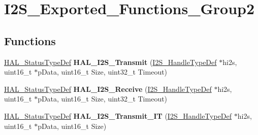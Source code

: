 \hypertarget{group___i2_s___exported___functions___group2}{}\section{I2\+S\+\_\+\+Exported\+\_\+\+Functions\+\_\+\+Group2}
\label{group___i2_s___exported___functions___group2}
\subsection*{Functions}
\begin{DoxyCompactItemize}
\item 
\mbox{\label{group___i2_s___exported___functions___group2_gad53c7444525547c934ee322ca1197dfb}} 
\hyperlink{stm32f4xx__hal__def_8h_a63c0679d1cb8b8c684fbb0632743478f}{H\+A\+L\+\_\+\+Status\+Type\+Def} {\bfseries H\+A\+L\+\_\+\+I2\+S\+\_\+\+Transmit} (\hyperlink{group___i2_s___exported___types_ga859f888192a094b456619601937580f5}{I2\+S\+\_\+\+Handle\+Type\+Def} $\ast$hi2s, uint16\+\_\+t $\ast$p\+Data, uint16\+\_\+t Size, uint32\+\_\+t Timeout)
\item 
\mbox{\label{group___i2_s___exported___functions___group2_ga41a95495dff412204cd4c5b631c061ea}} 
\hyperlink{stm32f4xx__hal__def_8h_a63c0679d1cb8b8c684fbb0632743478f}{H\+A\+L\+\_\+\+Status\+Type\+Def} {\bfseries H\+A\+L\+\_\+\+I2\+S\+\_\+\+Receive} (\hyperlink{group___i2_s___exported___types_ga859f888192a094b456619601937580f5}{I2\+S\+\_\+\+Handle\+Type\+Def} $\ast$hi2s, uint16\+\_\+t $\ast$p\+Data, uint16\+\_\+t Size, uint32\+\_\+t Timeout)
\item 
\mbox{\label{group___i2_s___exported___functions___group2_ga476c3a3540e53c0905e80bfb5d309db2}} 
\hyperlink{stm32f4xx__hal__def_8h_a63c0679d1cb8b8c684fbb0632743478f}{H\+A\+L\+\_\+\+Status\+Type\+Def} {\bfseries H\+A\+L\+\_\+\+I2\+S\+\_\+\+Transmit\+\_\+\+IT} (\hyperlink{group___i2_s___exported___types_ga859f888192a094b456619601937580f5}{I2\+S\+\_\+\+Handle\+Type\+Def} $\ast$hi2s, uint16\+\_\+t $\ast$p\+Data, uint16\+\_\+t Size)
\item 
\mbox{\label{group___i2_s___exported___functions___group2_ga0018752e02b7221625aca82b532b5864}} 

\end{DoxyCompactItemize}
